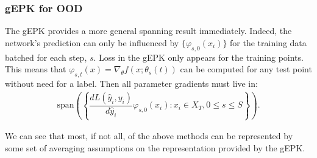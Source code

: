 \begin{frame}
\frametitle{gEPK for OOD}
The gEPK provides a more general spanning result immediately. Indeed, the network's prediction can only be influenced by $\{\varphi_{s, 0}(x_i)\}$ for the training data batched for each step, $s$. 
Loss in the gEPK only appears for the training points. This means that $\varphi_{s, t}(x) = \nabla_\theta f(x; \theta_s(t))$ can be computed for any test point without need for a label. Then all parameter gradients must live in:
\begin{align}
\text{span}\left(\left\{\dfrac{dL(\hat y_i, y_i)}{d\hat y_i} \varphi_{s, 0}(x_i) : x_i \in X_T , 0 \leq s \leq S\right\} \right). 
\end{align}

We can see that most, if not all, of the above methods can be
represented by some set of averaging assumptions on the representation
provided by the gEPK.
\end{frame}

